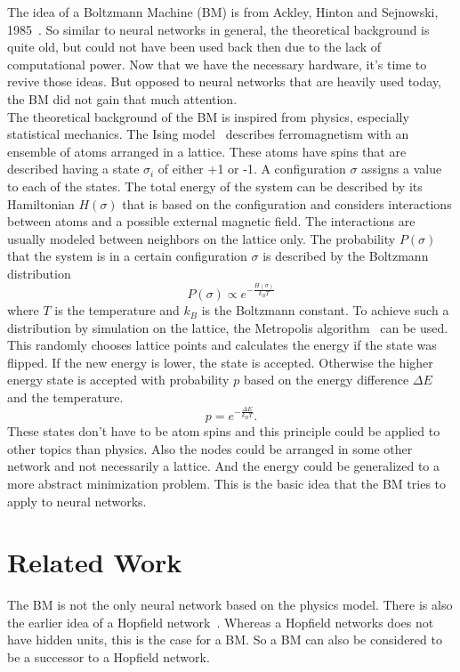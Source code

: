 \documentclass[12pt,twoside]{article}
\theoremstyle{plain}
\theoremstyle{definition}
\theoremstyle{remark}
\begin{document}
The idea of a Boltzmann Machine (BM) is from Ackley, Hinton and Sejnowski, 1985~\cite{Ackley}. So similar to neural networks in general, the theoretical background is quite old, but could not have been used back then due to the lack of computational power. Now that we have the necessary hardware, it's time to revive those ideas. But opposed to neural networks that are heavily used today, the BM did not gain that much attention.\\

The theoretical background of the BM is inspired from physics, especially statistical mechanics. The Ising model~\cite{Ising} describes ferromagnetism with an ensemble of atoms arranged in a lattice. These atoms have spins that are described having a state $\sigma_i$ of either +1 or -1. A configuration $\sigma$ assigns a value to each of the states. The total energy of the system can be described by its Hamiltonian $H(\sigma)$ that is based on the configuration and considers interactions between atoms and a possible external magnetic field. The interactions are usually modeled between neighbors on the lattice only. The probability $P(\sigma)$ that the system is in a certain configuration $\sigma$ is described by the Boltzmann distribution
$$P(\sigma) \propto e^{-\frac{H(\sigma)}{k_BT}}$$
where $T$ is the temperature and $k_B$ is the Boltzmann constant. To achieve such a distribution by simulation on the lattice, the Metropolis algorithm~\cite{Metropolis} can be used. This randomly chooses lattice points and calculates the energy if the state was flipped. If the new energy is lower, the state is accepted. Otherwise the higher energy state is accepted with probability $p$ based on the energy difference $\Delta E$ and the temperature.
$$p = e^{-\frac{\Delta E}{k_BT}}.$$
These states don't have to be atom spins and this principle could be applied to other topics than physics. Also the nodes could be arranged in some other network and not necessarily a lattice. And the energy could be generalized to a more abstract minimization problem. This is the basic idea that the BM tries to apply to neural networks.


\section{Related Work}
\label{sec:related}

The BM is not the only neural network based on the physics model. There is also the earlier idea of a Hopfield network~\cite{Hopfield}\cite[Chapter~13]{Rojas}\cite[Chapter~43]{MacKay}. Whereas a Hopfield networks does not have hidden units, this is the case for a BM. So a BM can also be considered to be a successor to a Hopfield network.
\end{document}
